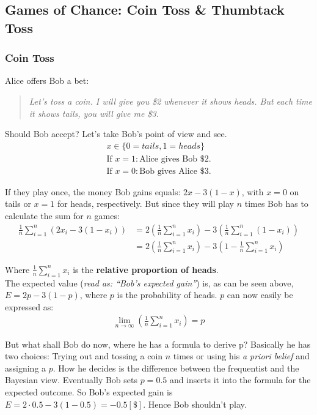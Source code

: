 \documentclass[../main/Notes.tex]{subfiles}
\begin{document}
\subsection{Games of Chance: Coin Toss \& Thumbtack Toss}

\subsubsection*{Coin Toss}

Alice offers Bob a bet: 
\begin{quote}
\textit{Let's toss a coin. I will give you  \$2  whenever it shows heads. But each time it shows tails, you will give me \$3.}
\end{quote}
Should Bob accept? Let's take Bob's point of view and see.
\begin{align*}
x \in \{0 = tails, 1 = heads\}\\
\mbox{If }x = 1: \mbox{Alice gives Bob \$2.}\\
\mbox{If }x = 0: \mbox{Bob gives Alice \$3.}
\end{align*}

If they play once, the money Bob gains equals: $2x - 3 (1 - x)$, with $x = 0$ on tails or $x = 1$ for heads, respectively.
But since they will play $n$ times Bob has to calculate the sum for $n$ games:
\begin{align*}
\frac{1}{n} \sum\limits_{i=1}^n \left(2x_i-3\left(1-x_i\right)\right) &= 2\left(\frac{1}{n}\sum\limits_{i=1}^n x_i\right)-3\left(\frac{1}{n}\sum\limits_{i=1}^n \left(1-x_i\right)\right)\\
&= 2\left(\frac{1}{n}\sum\limits_{i=1}^n x_i\right)-3\left(1-\frac{1}{n}\sum\limits_{i=1}^n x_i\right)
\end{align*}

Where $\frac{1}{n}\sum\limits_{i=1}^n x_i$ is the \textbf{relative proportion of heads}.\\
The expected value (\textit{read as: ``Bob's expected gain''}) is, as can be seen above, $E = 2p - 3 (1 - p)$, where $p$ is the probability of heads.
$p$ can now easily be expressed as:
\begin{align*}
\lim_{n\rightarrow\infty}\left(\frac{1}{n}\sum\limits_{i=1}^n x_i\right) = p
\end{align*}

But what shall Bob do now, where he has a formula to derive p? Basically he has two choices: Trying out and tossing a coin $n$ times or using his \textit{a priori belief} and assigning a $p$.
How he decides is the difference between the frequentist and the Bayesian view. 
Eventually Bob sets $p = 0.5$ and inserts it into the formula for the expected outcome.
So Bob's expected gain is $E = 2 \cdot 0.5 - 3 (1 - 0.5) = -0.5 \! \left[ \$ \right] $. Hence Bob shouldn't play.
\end{document}
